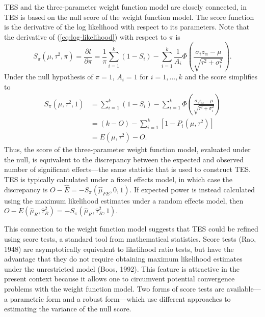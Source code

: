 \documentclass[man,floatsintext]{apa6}
\begin{document}
TES and the three-parameter weight function model are closely connected, in TES is based on the null score of the weight function model.
The score function is the derivative of the log likelihood with respect to its parameters.
Note that the derivative of (\ref{eq:log-likelihood}) with respect to \(\pi\) is
\begin{equation}
S_\pi(\mu, \tau^2, \pi) = \frac{\partial l}{\partial \pi} = \frac{1}{\pi} \sum_{i=1}^k (1 - S_i) - \sum_{i=1}^k \frac{1}{A_i} \Phi\left( \frac{\sigma_i z_\alpha - \mu}{\sqrt{\tau^2 + \sigma_i^2}}\right).
\label{eq:score-pi}
\end{equation}
Under the null hypothesis of \(\pi = 1\), \(A_i = 1\) for \(i = 1,...,k\) and the score simplifies to
\[
\begin{aligned}
S_\pi(\mu, \tau^2, 1) &= \sum_{i=1}^k (1 - S_i) - \sum_{i=1}^k \Phi\left( \frac{\sigma_i z_\alpha - \mu}{\sqrt{\tau^2 + \sigma_i^2}}\right) \\
&= (k - O) - \sum_{i=1}^k \left[1 - P_i(\mu, \tau^2)\right] \\
&= E(\mu,\tau^2) - O.
\end{aligned}
\]
Thus, the score of the three-parameter weight function model, evaluated under the null, is equivalent to the discrepancy between the expected and observed number of significant effects---the same statistic that is used to construct TES.
TES is typically calculated under a fixed effects model, in which case the discrepancy is \(O - \hat{E} = - S_\pi(\hat\mu_{FE}, 0, 1)\). If expected power is instead calculated using the maximum likelihood estimates under a random effects model, then \(O - E(\hat\mu_R, \hat\tau^2_R) = - S_\pi(\hat\mu_R, \hat\tau^2_R, 1)\).

This connection to the weight function model suggests that TES could be refined using score tests, a standard tool from mathematical statistics. Score tests (Rao, 1948) are asymptotically equivalent to likelihood ratio tests, but have the advantage that they do not require obtaining maximum likelihood estimates under the unrestricted model (Boos, 1992). This feature is attractive in the present context because it allows one to circumvent potential convergence problems with the weight function model. Two forms of score tests are available---a parametric form and a robust form---which use different approaches to estimating the variance of the null score.
\end{document}
